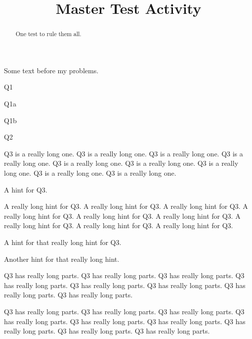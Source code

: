 \documentclass{ximera}
\title{Master Test Activity}
\begin{document}
\begin{abstract}
  One test to rule them all.
\end{abstract}

\maketitle

Some text before my problems.

\begin{problem}
	Q1
	\begin{parts}[hide]
		\item Q1a
		\item Q1b
	\end{parts}
\end{problem}

\begin{question}
	Q2
\end{question}

\begin{question}
	Q3 is a really long one. Q3 is a really long one. Q3 is a really long one. Q3 is a really long one. Q3 is a really long one. Q3 is a really long one. Q3 is a really long one. Q3 is a really long one. Q3 is a really long one. 
	\begin{hints}
		\item A hint for Q3.
		\item A really long hint for Q3. A really long hint for Q3. A really long hint for Q3. A really long hint for Q3. A really long hint for Q3. A really long hint for Q3. A really long hint for Q3. A really long hint for Q3. A really long hint for Q3.
		\begin{hints}
			\item A hint for that really long hint for Q3.
		\end{hints}
		\begin{hints}
			\item Another hint for that really long hint.
		\end{hints}
	\end{hints}
	\begin{parts}
		\item Q3 has really long parts. Q3 has really long parts. Q3 has really long parts. Q3 has really long parts. Q3 has really long parts. Q3 has really long parts. Q3 has really long parts. Q3 has really long parts. 
		\item Q3 has really long parts. Q3 has really long parts. Q3 has really long parts. Q3 has really long parts. Q3 has really long parts. Q3 has really long parts. Q3 has really long parts. Q3 has really long parts. Q3 has really long parts. 
	\end{parts}
\end{question}
\end{document}
